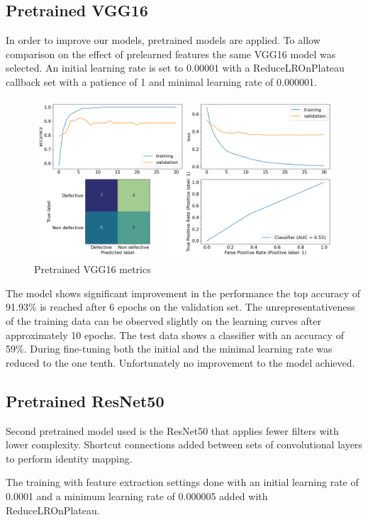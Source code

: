 \documentclass[10pt, final]{article}
\begin{document}
\subsection{Pretrained VGG16}
In order to improve our models, pretrained models are applied.
To allow comparison on the effect of prelearned features the same VGG16 model was selected.
An initial learning rate  is set to 0.00001 with a ReduceLROnPlateau callback set with a patience of 1 and minimal
learning rate of 0.000001.

\begin{figure}[!ht]
	\centering
	\includegraphics[width=\textwidth]{./tex_graphs/metrics_VGG16_pretrained.png}
	\caption{Pretrained VGG16 metrics}
	\label{fig:VGG16_pretrained_metrics}
\end{figure}

The model shows significant improvement in the performance the top accuracy of 91.93\% is reached after 6 epochs
on the validation set.
The unrepresentativeness of the training data can be observed slightly on the learning curves after approximately
10 epochs.
The test data shows a classifier with an accuracy of 59\%.
During fine-tuning both the initial and the minimal learning rate was reduced to the one tenth.
Unfortunately no improvement to the model achieved.

\subsection{Pretrained ResNet50}

Second pretrained model used is the ResNet50 that applies fewer filters with lower complexity.
Shortcut connections added between sets of convolutional layers to perform identity mapping.

The training with feature extraction settings done with an initial learning rate of 0.0001 and a minimum learning
rate of 0.000005 added with ReduceLROnPlateau.
\end{document}
